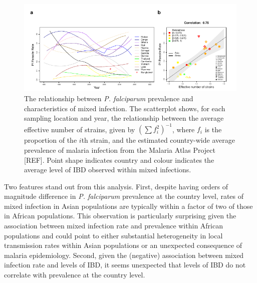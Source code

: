 \documentclass[9pt,lineno]{elife}
\begin{document}
\begin{figure}[h]
  \centering{}
    \includegraphics[width=\textwidth]{Fig5.pdf}
  \caption{The relationship between {\it P. falciparum} prevalence and characteristics of mixed infection.  The scatterplot shows, for each sampling location and year, the relationship between the average effective number of strains, given by $(\sum f_i^2)^{-1}$, where $f_i$ is the proportion of the $i$th strain, and the estimated country-wide average prevalence of malaria infection from the Malaria Atlas Project [REF].  Point shape indicates country and colour indicates the average level of IBD observed within mixed infections. }
  \label{fig:pfpr}
\end{figure}

Two features stand out from this analysis.  First, despite having orders of magnitude difference in {\it P. falciparum} prevalence at the country level, rates of mixed infection in Asian populations are typically within a factor of two of those in African populations.  This observation is particularly surprising given the association between mixed infection rate and prevalence within African populations and could point to either substantial heterogeneity in local transmission rates within Asian populations or an unexpected consequence of malaria epidemiology.  Second, given the (negative) association between mixed infection rate and levels of IBD, it seems unexpected that levels of IBD do not correlate with prevalence at the country level.
\end{document}
